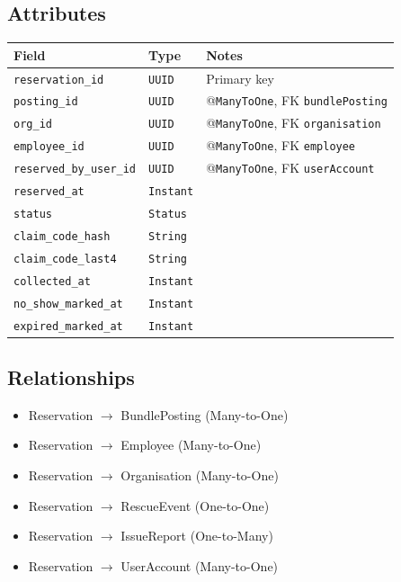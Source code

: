 \documentclass[a4paper,11pt]{article}
\begin{document}
\subsection*{Attributes}
\begin{longtable}{|p{4cm}|p{3cm}|p{6cm}|}
\hline
\textbf{Field} & \textbf{Type} & \textbf{Notes} \\
\hline
\texttt{reservation\_id} & \texttt{UUID} & Primary key \\
\texttt{posting\_id} & \texttt{UUID} & @\texttt{ManyToOne}, FK \texttt{bundlePosting} \\
\texttt{org\_id} & \texttt{UUID} & @\texttt{ManyToOne}, FK \texttt{organisation}\\
\texttt{employee\_id} & \texttt{UUID} & @\texttt{ManyToOne}, FK \texttt{employee} \\
\texttt{reserved\_by\_user\_id} & \texttt{UUID} & @\texttt{ManyToOne}, FK \texttt{userAccount} \\
\texttt{reserved\_at} & \texttt{Instant} &  \\
\texttt{status} & \texttt{Status} & \\
\texttt{claim\_code\_hash} & \texttt{String} & \\
\texttt{claim\_code\_last4} & \texttt{String} & \\
\texttt{collected\_at} & \texttt{Instant} & \\
\texttt{no\_show\_marked\_at} & \texttt{Instant} &  \\
\texttt{expired\_marked\_at} & \texttt{Instant} &  \\
\hline
\end{longtable}

\subsection*{Relationships}
\begin{itemize}
  \item Reservation $\rightarrow$ BundlePosting (Many-to-One)
  \item Reservation $\rightarrow$ Employee (Many-to-One)
  \item Reservation $\rightarrow$ Organisation (Many-to-One)
  \item Reservation $\rightarrow$ RescueEvent (One-to-One)
  \item Reservation $\rightarrow$ IssueReport (One-to-Many)
  \item Reservation $\rightarrow$ UserAccount (Many-to-One)
\end{itemize}
\end{document}
